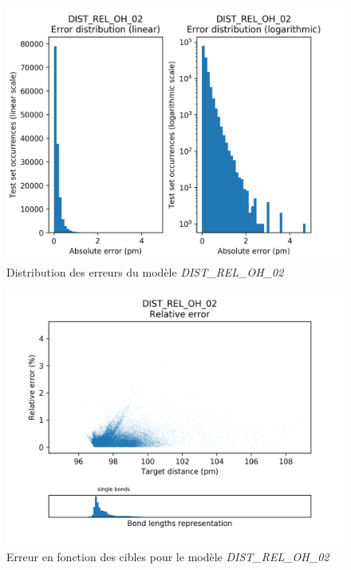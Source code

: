 \begin{figure}[!h]
	\centering
	
	\includegraphics[scale=0.8]{../figures/DIST_REL_OH_02/DIST_REL_OH_02_distrib_rmse_val.png}	
	
	\caption{Distribution des erreurs du modèle \emph{DIST\_REL\_OH\_02}}
\end{figure}
\begin{figure}[!h]
	\centering
	
	\includegraphics[scale=0.8]{../figures/DIST_REL_OH_02/DIST_REL_OH_02_distrib_rmse_dist.png}	
	
	\caption{Erreur en fonction des cibles pour le modèle \emph{DIST\_REL\_OH\_02}}
	\end{figure}

